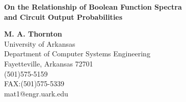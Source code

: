 \begin{center}
{\Large \bf On the Relationship of Boolean Function Spectra \\
and Circuit Output Probabilities}
\end{center}

\begin{center}
{\bf  M. A. Thornton} \\
University of Arkansas \\
Department of Computer Systems Engineering \\
Fayetteville, Arkansas 72701 \\
(501)575-5159 \\
FAX:(501)575-5339 \\
mat1@engr.uark.edu \\
\end{center}
